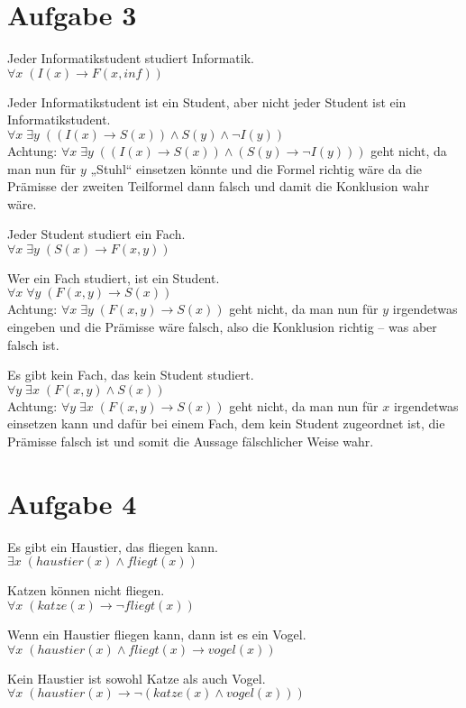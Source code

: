 \documentclass{scrreprt}
\begin{document}
\section{Aufgabe 3}
\begin{anumerate}
\item Jeder Informatikstudent studiert Informatik.\\
$\forall x \; (I(x) \to F(x,inf))$
\item Jeder Informatikstudent ist ein Student, aber nicht jeder Student ist ein Informatikstudent.\\
$\forall x \; \exists y \; ((I(x) \to S(x)) \wedge S(y) \wedge \neg I(y))  $\\
Achtung: $\forall x \; \exists y \;((I(x) \to S(x)) \wedge (S(y) \to \neg I(y)))$ geht nicht, da man nun für $y$ „Stuhl“ einsetzen könnte und die Formel richtig wäre da die Prämisse der zweiten Teilformel dann falsch und damit die Konklusion wahr wäre.
\item Jeder Student studiert ein Fach.\\
$\forall x \; \exists y \; (S(x) \to F(x,y))$
\item Wer ein Fach studiert, ist ein Student.\\
$\forall x \; \forall y \; (F(x,y) \to S(x))$\\
Achtung: $\forall x \; \exists y \; (F(x,y) \to S(x))$ geht nicht, da man nun für $y$ irgendetwas eingeben und die Prämisse wäre falsch, also die Konklusion richtig -- was aber falsch ist.
\item Es gibt kein Fach, das kein Student studiert.\\
$\forall y \; \exists x \; (F(x,y) \wedge S(x))$\\
Achtung: $\forall y \; \exists x \; (F(x,y) \to S(x))$ geht nicht, da man nun für $x$ irgendetwas einsetzen kann und dafür bei einem Fach, dem kein Student zugeordnet ist, die Prämisse falsch ist und somit die Aussage fälschlicher Weise wahr.
\end{anumerate}

\section{Aufgabe 4}
\begin{anumerate}
\item Es gibt ein Haustier, das fliegen kann.\\
$\exists x\; (haustier(x) \wedge fliegt (x))$
\item Katzen können nicht fliegen.\\
$\forall x\; (katze(x) \to \neg fliegt(x))$
\item Wenn ein Haustier fliegen kann, dann ist es ein Vogel.\\
$\forall x\; (haustier(x) \wedge fliegt(x) \to vogel(x))$
\item  Kein Haustier ist sowohl Katze als auch Vogel.\\
$\forall x\; (haustier(x) \to \neg (katze(x) \wedge vogel(x)))$
\end{anumerate}
\end{document}
